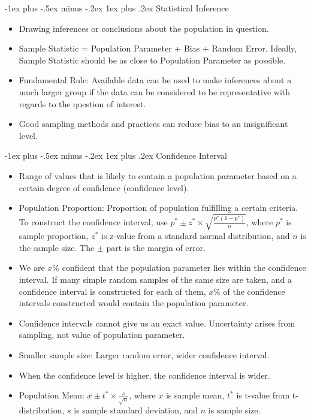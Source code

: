 \documentclass[10pt, landscape]{article}
\makeatletter
\renewcommand{\subsection}{\@startsection{subsection}{3}{0mm}%
                                {-1ex plus -.5ex minus -.2ex}%
                                {1ex plus .2ex}%
                                {\normalfont\small\bfseries}}%
\makeatother
\begin{document}
\begin{multicols*}{3}
\subsection{Statistical Inference}
\begin{itemize}
    \item Drawing inferences or conclusions about the population in question.
    \item Sample Statistic = Population Parameter + Bias + Random Error. Ideally, Sample Statistic should be as close to Population Parameter as possible.
    \item Fundamental Rule: Available data can be used to make inferences about a much larger group if the data can be considered to be representative with regards to the question of interest.
    \item Good sampling methods and practices can reduce bias to an insignificant level.
\end{itemize}

\subsection{Confidence Interval}
\begin{itemize}
    \item Range of values that is likely to contain a population parameter based on a certain degree of confidence (confidence level).
    \item Population Proportion: Proportion of population fulfilling a certain criteria. To construct the confidence interval, use $p^* \pm z^* \times \sqrt{\frac{p^*(1-p^*)}{n}}$, where $p^*$ is sample proportion, $z^*$ is z-value from a standard normal distribution, and $n$ is the sample size. The $\pm$ part is the margin of error.
    \item We are $x\%$ confident  that the population parameter lies within the confidence interval. If many simple random samples of the same size are taken, and a confidence interval is constructed for each of them, $x\%$ of the confidence intervals constructed would contain the population parameter.
    \item Confidence intervals cannot give us an exact value. Uncertainty arises from sampling, not value of population parameter.
    \item Smaller sample size: Larger random error, wider confidence interval.
    \item When the confidence level is higher, the confidence interval is wider.
    \item Population Mean: $\bar{x}\pm t^* \times \frac{s}{\sqrt{n}}$, where $\bar{x}$ is sample mean, $t^*$ is t-value from t-distribution, $s$ is sample standard deviation, and $n$ is sample size.
\end{itemize}


\end{multicols*}
\end{document}
